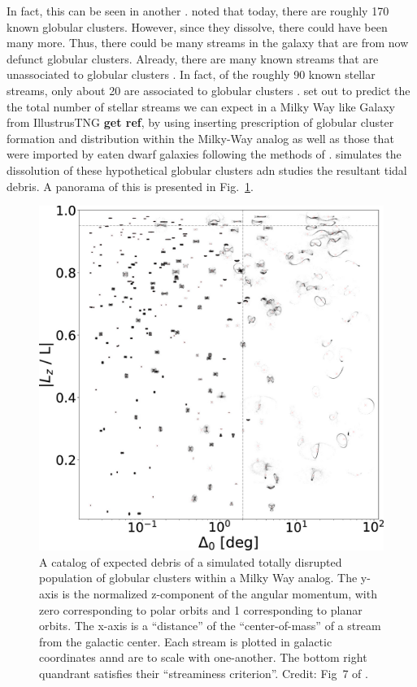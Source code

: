             In fact, this can be seen in another \citet{2024ApJ...976...54P}. \citet{2024ApJ...976...54P} noted that today, there are roughly 170 known globular clusters. However, since they dissolve, there could have been many more. Thus, there could be many streams in the galaxy that are from now defunct globular clusters. Already, there are many known streams that are unassociated to globular clusters \citep{2022ApJ...926..107M}. In fact, of the roughly 90 known stellar streams, only about 20 are associated to globular clusters \citep{2024ApJ...967...89I}. \citet{2024ApJ...976...54P} set out to predict the the total number of stellar streams we can expect in a Milky Way like Galaxy from IllustrusTNG \textbf{get ref}, by using inserting prescription of globular cluster formation and distribution within the Milky-Way analog as well as those that were imported by eaten dwarf galaxies following the methods of \citet{2022MNRAS.514.4736C,2023MNRAS.522.5638C}. \citet{2024ApJ...976...54P} simulates the dissolution of these hypothetical globular clusters adn studies the resultant tidal debris. A panorama of this is presented in Fig.~\ref{fig:perason-2024-fig}. 

            \begin{figure}
                \includegraphics[width=\linewidth]{images/perason-2024-fig.jpg}
                \caption{A catalog of expected debris of a simulated totally disrupted population of globular clusters within a Milky Way analog. The y-axis is the normalized z-component of the angular momentum, with zero corresponding to polar orbits and 1 corresponding to planar orbits. The x-axis is a ``distance'' of the ``center-of-mass'' of a stream from the galactic center. Each stream is plotted in galactic coordinates annd are to scale with one-another. The bottom right quandrant satisfies their ``streaminess criterion''. Credit: Fig~7 of  \citet{2024ApJ...976...54P}.}
                \label{fig:perason-2024-fig}
            \end{figure}

